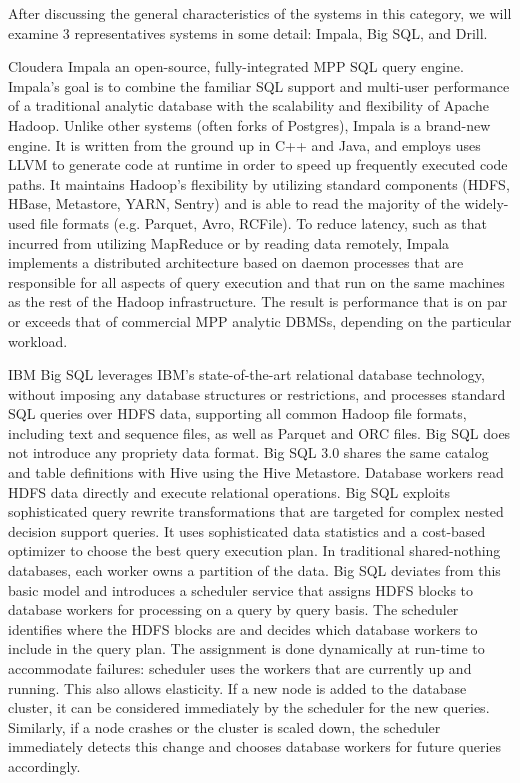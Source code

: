\documentclass{vldb}
\begin{document}
After discussing the general characteristics of the systems in this category, we will examine 3 representatives systems in some detail: Impala, Big SQL, and Drill. 

Cloudera Impala \cite{Kornacker+15} an open-source, fully-integrated MPP SQL query engine. Impala's goal is to combine the familiar SQL support and multi-user performance of a traditional analytic database with the scalability and flexibility of Apache Hadoop. Unlike other systems (often forks of Postgres), Impala is a brand-new engine. It is written from the ground up in C++ and Java, and employs uses LLVM to generate code at runtime in order to speed up frequently executed code paths. It maintains Hadoop's flexibility by utilizing standard components (HDFS, HBase, Metastore, YARN, Sentry) and is able to read the majority of the widely-used file formats (e.g. Parquet, Avro, RCFile). To reduce latency, such as that incurred from utilizing MapReduce or by reading data remotely, Impala implements a distributed architecture based on daemon processes that are responsible for all aspects of query execution and that run on the same machines as the rest of the Hadoop infrastructure. The result is performance that is on par or exceeds that of commercial MPP analytic DBMSs, depending on the particular workload.

IBM Big SQL \cite{bigsql} leverages IBM's state-of-the-art relational database technology, without imposing any database structures or restrictions, and processes standard SQL queries over HDFS data, supporting all common Hadoop file formats, including text and sequence files, as well as Parquet and ORC files. Big SQL does not introduce any propriety data format. Big SQL 3.0 shares the same catalog and table definitions with Hive using the Hive Metastore. Database workers read HDFS data directly and execute relational operations. Big SQL exploits sophisticated query rewrite transformations \cite{pirahesh96, winmagic} that are targeted for complex nested decision support queries. It uses sophisticated data statistics and a cost-based optimizer to choose the best query execution plan. In traditional shared-nothing databases, each worker owns a partition of the data. Big SQL deviates from this basic model and introduces a scheduler service that assigns HDFS blocks to database workers for processing on a query by query basis. The scheduler identifies where the HDFS blocks are and decides which database workers to include in the query plan. The assignment is done dynamically at run-time to accommodate failures: scheduler uses the workers that are currently up and running. This also allows elasticity. If a new node is added to the database cluster, it can be considered immediately by the scheduler for the new queries. Similarly, if a node crashes or the cluster is scaled down, the scheduler immediately detects this change and chooses database workers for future queries accordingly.
\end{document}
